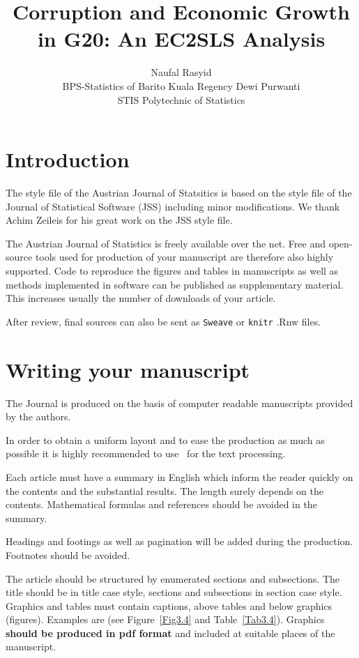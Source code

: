 \documentclass[article]{ajs}
\author{Naufal Rasyid\\ BPS-Statistics of Barito Kuala Regency \And 
        Dewi Purwanti\\ STIS Polytechnic of Statistics}
\title{Corruption and Economic Growth in G20: An EC2SLS Analysis}
\begin{document}


\section{Introduction}


The style file of the Austrian Journal of Statsitics is based on the style file of the Journal of Statistical Software (JSS) including minor modifications. We thank Achim Zeileis for his great work on the JSS style file.

The Austrian Journal of Statistics is freely available over the net. Free and open-source tools used for production of your manuscript are therefore also highly supported. Code to reproduce the figures and tables in manuscripts as well as methods implemented in software can be published as supplementary material. This increases usually the number of 
downloads of your article.

After review, final sources can also be sent as \texttt{Sweave} \citep[see, e.g.,][]{leisch02} or \texttt{knitr} \citep{yihui13} .Rnw files.



\section{Writing your manuscript}

The Journal is produced on the basis of computer readable
manuscripts provided by the authors. 


In order to obtain a uniform layout and to ease the production as
much as possible it is highly recommended to use \LaTeXe\ for the
text processing. 

Each article must have a summary in English which
inform the reader quickly on the contents and the substantial
results. The length surely depends on the contents. 
Mathematical formulas and references should be
avoided in the summary.

Headings and footings as well as pagination will be added during
the production. Footnotes should be avoided.

The article should be structured by enumerated sections and
subsections. The title should be in title case style, sections and subsections in section case style. Graphics and tables must contain captions, above
tables and below graphics (figures). Examples are (see Figure~\ref{Fig3.4} and Table~\ref{Tab3.4}).
Graphics \textbf{should be produced in \textbf{pdf} format} and included 
 at suitable places of the manuscript. 
\end{document}
